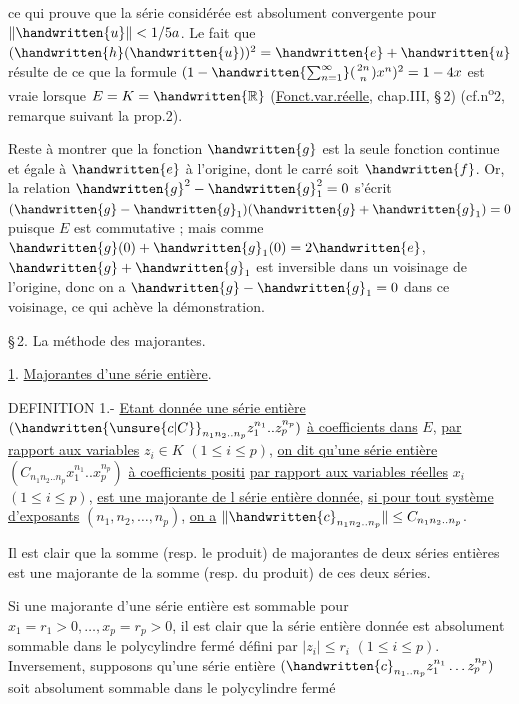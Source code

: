 
ce qui prouve que la série considérée est absolument convergente pour $\|\handwritten{u}\|<1/5a$. Le fait que $(\handwritten{h}(\handwritten{u}))^2=\handwritten{e}+\handwritten{u}$ résulte de ce que la formule $(1-\handwritten{\sum_{n=1}^{\infty}}(\genfrac{}{}{0pt}{}{2n}{n})x^n)^2=1-4x$ est vraie lorsque $E=K=\handwritten{\mathbb R}$ (\uline{Fonct.var.réelle}, chap.III, \S\,2) (cf.n\textsuperscript{o}2, remarque suivant la prop.2).

Reste à montrer que la fonction $\handwritten{g}$ est la seule fonction continue et égale à $\handwritten{e}$ à l'origine, dont le carré soit $\handwritten{f}$. Or, la relation $\handwritten{g}^2-\handwritten{g}_1^2=0$ s'écrit $(\handwritten{g}-\handwritten{g}_1)(\handwritten{g}+\handwritten{g}_1)=0$ puisque $E$ est commutative ; mais comme $\handwritten{g}(0)+\handwritten{g}_1(0)=2\handwritten{e}$, $\handwritten{g}+\handwritten{g}_1$ est inversible dans un voisinage de l'origine, donc on a $\handwritten{g}-\handwritten{g}_1=0$ dans ce voisinage, ce qui achève la démonstration.

\S\,2. La méthode des majorantes.

\uline{1}. \uline{Majorantes d'une série entière}.

DEFINITION 1.- \uline{Etant donnée une série entière} $(\handwritten{\unsure{c|C}}_{n_1n_2..n_p}z_1^{n_1}..z_p^{n_p})$ \uline{à coefficients dans} $E$, \uline{par rapport aux variables} $z_i\in K$ $(1\leq i\leq p)$, \uline{on dit qu'une série entière} $(C_{n_1n_2..n_p}x_1^{n_1}..x_p^{n_p})$ \uline{à coefficients positi} \uline{par rapport aux variables réelles} $x_i$ $(1\leq i\leq p)$, \uline{est une majorante de l série entière donnée,} \uline{si pour tout système d'exposants} $(n_1,n_2,\ldots,n_p)$, \uline{on a} $\|\handwritten{c}_{n_1n_2..n_p}\|\leq C_{n_1n_2..n_p}$.

Il est clair que la somme (resp. le produit) de majorantes de deux séries entières est une majorante de la somme (resp. du produit) de ces deux séries.

Si une majorante d'une série entière est sommable pour $x_1=r_1>0,\ldots,x_p=r_p>0$, il est clair que la série entière donnée est absolument somma\unsure{-|{}}ble dans le polycylindre fermé défini par $|z_i|\leq r_i$ $(1\leq i\leq p)$. Inversement, supposons qu'une série entière $(\handwritten{c}_{n_1..n_p}z_1^{n_1}\ldots z_p^{n_p})$ soit absolument sommable dans le polycylindre fermé

